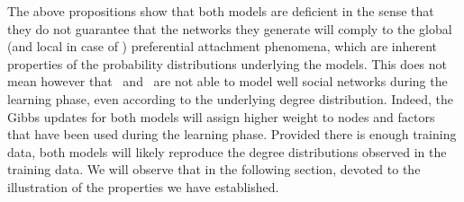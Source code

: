 The above propositions show that both models are deficient in the sense that they do not guarantee that the networks they generate will comply to the global (and local in case of \ifm) preferential attachment phenomena, which are inherent properties of the probability distributions underlying the models. This does not mean however that \ifm\ and \imb\ are not able to model well social networks during the learning phase, even according to the underlying degree distribution. Indeed, the Gibbs updates for both models will assign higher weight to nodes and factors that have been used during the learning phase. Provided there is enough training data, both models will likely reproduce the degree distributions observed in the training data. We will observe that in the following section, devoted to the illustration of the properties we have established.
